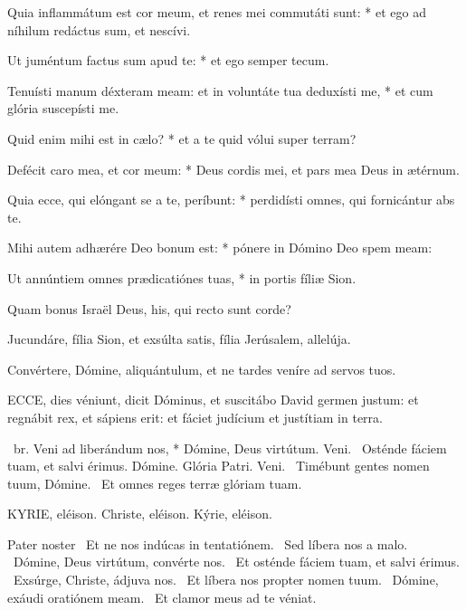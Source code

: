 Quia inflammátum est cor meum, et renes mei commutáti sunt: * et ego ad níhilum redáctus sum, et nescívi.

Ut juméntum factus sum apud te: * et ego semper tecum.

Tenuísti manum déxteram meam: et in voluntáte tua deduxísti me, * et cum glória suscepísti me.

Quid enim mihi est in cælo? * et a te quid vólui super terram?

Defécit caro mea, et cor meum: * Deus cordis mei, et pars mea Deus in ætérnum.

Quia ecce, qui elóngant se a te, períbunt: * perdidísti omnes, qui fornicántur abs te.

Mihi autem adhærére Deo bonum est: * pónere in Dómino Deo spem meam:

Ut annúntiem omnes prædicatiónes tuas, * in portis fíliæ Sion.

  Quam bonus Israël Deus, his, qui recto sunt corde?


  Jucundáre, fília Sion, et exsúlta satis, fília Jerúsalem, allelúja.

  Convértere, Dómine, aliquántulum, et ne tardes veníre ad servos tuos.


\lettrine[lines=2]{E}{CCE}, dies véniunt, dicit Dóminus, et suscitábo David germen justum: et regnábit rex, et sápiens erit: et fáciet judícium et justítiam in terra.

\R\ br. Veni ad liberándum nos, * Dómine, Deus virtútum. Veni. \V\ Osténde fáciem tuam, et salvi érimus. Dómine. Glória Patri. Veni. \V\ Timébunt gentes nomen tuum, Dómine. \R\ Et omnes reges terræ glóriam tuam.

\label{feria5:precesferialester}

KYRIE, eléison. Christe, eléison. Kýrie, eléison.

Pater noster  \V\ Et ne nos indúcas in tentatiónem. \R\ Sed líbera nos a malo. \V\ Dómine, Deus virtútum, convérte nos. \R\ Et osténde fáciem tuam, et salvi érimus. \V\ Exsúrge, Christe, ádjuva nos. \R\ Et líbera nos propter nomen tuum. \V\ Dómine, exáudi oratiónem meam. \R\ Et clamor meus ad te véniat.

